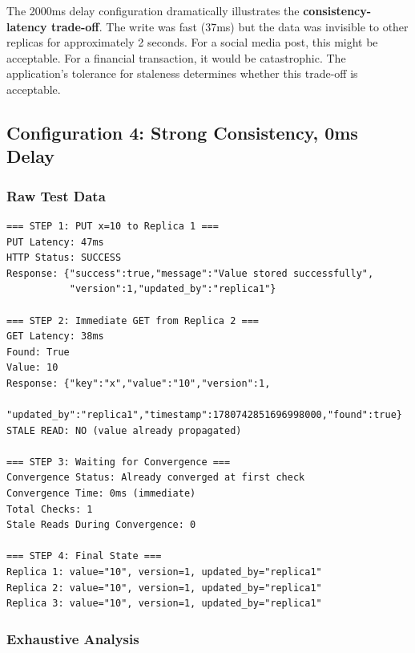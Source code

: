 \documentclass[10pt,a4paper]{article}
\begin{document}
The 2000ms delay configuration dramatically illustrates the \textbf{consistency-latency trade-off}. The write was fast (37ms) but the data was invisible to other replicas for approximately 2 seconds. For a social media post, this might be acceptable. For a financial transaction, it would be catastrophic. The application's tolerance for staleness determines whether this trade-off is acceptable.

\subsection{Configuration 4: Strong Consistency, 0ms Delay}

\subsubsection{Raw Test Data}

\begin{verbatim}
=== STEP 1: PUT x=10 to Replica 1 ===
PUT Latency: 47ms
HTTP Status: SUCCESS
Response: {"success":true,"message":"Value stored successfully",
           "version":1,"updated_by":"replica1"}

=== STEP 2: Immediate GET from Replica 2 ===
GET Latency: 38ms
Found: True
Value: 10
Response: {"key":"x","value":"10","version":1,
           "updated_by":"replica1","timestamp":1780742851696998000,"found":true}
STALE READ: NO (value already propagated)

=== STEP 3: Waiting for Convergence ===
Convergence Status: Already converged at first check
Convergence Time: 0ms (immediate)
Total Checks: 1
Stale Reads During Convergence: 0

=== STEP 4: Final State ===
Replica 1: value="10", version=1, updated_by="replica1"
Replica 2: value="10", version=1, updated_by="replica1"
Replica 3: value="10", version=1, updated_by="replica1"
\end{verbatim}

\subsubsection{Exhaustive Analysis}
\end{document}
